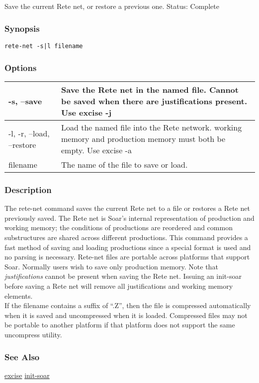 \subsection{}
\label{rete-net}
Save the current Rete net, or restore a previous one. 
 Status: Complete
\subsubsection*{Synopsis}
\begin{verbatim}
rete-net -s|l filename
\end{verbatim}
\subsubsection*{Options}
\begin{tabular}{|l|l|}
\hline 
 -s, --save  & Save the Rete net in the named file. Cannot be saved when there are justifications present. Use excise -j \\
 \hline 
 -l, -r, --load, --restore  & Load the named file into the Rete network. working memory and production memory must both be empty. Use excise -a \\
 \hline 
filename & The name of the file to save or load.  \\
 \hline 
\end{tabular}
\subsubsection*{Description}
 The rete-net command saves the current Rete net to a file or restores a Rete net previously saved. The Rete net is Soar's internal representation of production and working memory; the conditions of productions are reordered and common substructures are shared across different productions. This command provides a fast method of saving and loading productions since a special format is used and no parsing is necessary. Rete-net files are portable across platforms that support Soar. 
 Normally users wish to save only production memory. Note that \emph{justifications}
 cannot be present when saving the Rete net. Issuing an init-soar before saving a Rete net will remove all justifications and working memory elements. \\ 
 If the filename contains a suffix of ``.Z'', then the file is compressed automatically when it is saved and uncompressed when it is loaded. Compressed files may not be portable to another platform if that platform does not support the same uncompress utility. 
\subsubsection*{See Also}
\hyperref[excise]{excise} \hyperref[init-soar]{init-soar} 